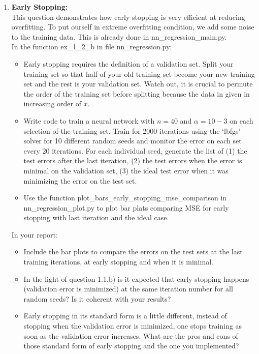 \documentclass[a4paper]{article}
\begin{document}
\begin{enumerate}[label=(\alph*)]
    \item \textbf{Early Stopping:}\\
    This question demonstrates how early stopping is very efficient at reducing overfitting. To put ourself in extreme overfitting condition, we add some noise to the training data. This is already done in nn\_regression\_main.py.\\
	In the function ex\_1\_2\_b in file nn\_regression.py:
    \begin{itemize}
        \item Early stopping requires the definition of a validation set. Split your training set so that half of your old training set become your new training set and the rest is your validation set. Watch out, it is crucial to permute the order of the training set before splitting because the data in given in increasing order of $x$.
        \item Write code to train a neural network with $n = 40$ and $\alpha = 10−3$ on each selection of the training set. Train for 2000 iterations using the ‘lbfgs’ solver for 10 different random seeds and monitor the error on each set every 20  iterations. For each individual seed, generate the list of (1) the test errors after the last iteration, (2) the test errors when the error is minimal on the validation set, (3) the ideal test error when it was minimizing the error on the test set.
        \item Use the function plot\_bars\_early\_stopping\_mse\_comparison in nn\_regression\_plot.py to plot bar plats comparing MSE for early stopping with last iteration and the ideal case.
    \end{itemize}
    In your report: 
    \begin{itemize}
        \item Include the bar plots to compare the errors on the test sets at the last training iterations, at early stopping and when it is minimal.
        \item In the light of question 1.1.b) is it expected that early stopping happens (validation error is minimized) at the same iteration number for all random seeds? Is it coherent with your results?
        \item Early stopping in its standard form is a little different, instead of stopping when the validation error is minimized, one stops training as soon as the validation error increases. What are the pros and cons of those standard form of early stopping and the one you implemented?
    \end{itemize}


\end{enumerate}
\end{document}
